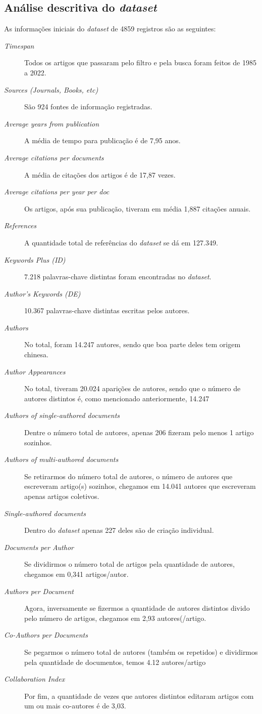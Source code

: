 \subsection{Análise descritiva do \emph{dataset}}
    As informações iniciais do \emph{dataset} de 4859 registros são as seguintes:
    
\begin{description}
    \item [\textit{Timespan}] Todos os artigos que passaram pelo filtro e pela busca foram feitos de 1985 a 2022.
    \item [\textit{Sources (Journals, Books, etc)}] São 924 fontes de informação registradas.
    \item [\textit{Average years from publication}] A média de tempo para publicação é de 7,95 anos.
    \item [\textit{Average citations per documents}] A média de citações dos artigos é de 17,87 vezes.
    \item [\textit{Average citations per year per doc}] Os artigos, após sua publicação, tiveram em média 1,887 citações anuais.
    \item [\textit{References}] A quantidade total de referências do \emph{dataset} se dá em 127.349.
    \item [\textit{Keywords Plus (ID)}] 7.218 palavras-chave distintas foram encontradas no \emph{dataset}.
    \item [\textit{Author's Keywords (DE)}] 10.367 palavras-chave distintas escritas pelos autores.
    \item [\textit{Authors}] No total, foram 14.247 autores, sendo que boa parte deles tem origem chinesa.
    \item [\textit{Author Appearances}] No total, tiveram 20.024 aparições de autores, sendo que o número de autores distintos é, como mencionado anteriormente, 14.247
    \item [\textit{Authors of single-authored documents}] Dentre o número total de autores, apenas 206 fizeram pelo menos 1 artigo sozinhos.
    \item [\textit{Authors of multi-authored documents}] Se retirarmos do número total de autores, o número de autores que escreveram artigo(s) sozinhos, chegamos em 14.041 autores que escreveram apenas artigos coletivos.
    \item [\textit{Single-authored documents}] Dentro do \emph{dataset} apenas 227 deles são de criação individual.
    \item [\textit{Documents per Author}] Se dividirmos o número total de artigos pela quantidade de autores, chegamos em 0,341 artigos/autor.
    \item [\textit{Authors per Document}] Agora, inversamente se fizermos a quantidade de autores distintos divido pelo número de artigos, chegamos em 2,93 autores(/artigo.
    \item [\textit{Co-Authors per Documents}] Se pegarmos o número total de autores (também os repetidos) e dividirmos pela quantidade de documentos, temos 4.12 autores/artigo
    \item [\textit{Collaboration Index}] Por fim, a quantidade de vezes que autores distintos editaram artigos com um ou mais co-autores é de 3,03.
\end{description}
